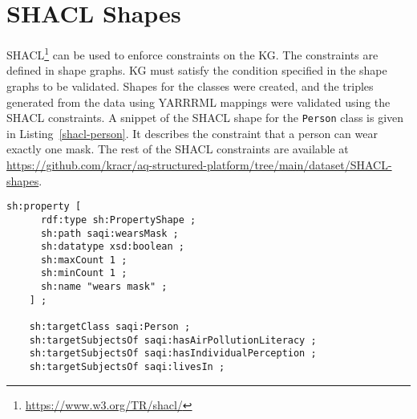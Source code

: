 \section{SHACL Shapes}
\label{sec:shacl}

SHACL\footnote{\url{https://www.w3.org/TR/shacl/}} can be used to enforce constraints on the KG. The constraints are defined in shape graphs. KG must satisfy the condition specified in the shape graphs to be validated. Shapes for the classes were created, and the triples generated from the data using YARRRML mappings were validated using the SHACL constraints. A snippet of the SHACL shape for the \texttt{Person} class is given in Listing~\ref{shacl-person}. It describes the constraint that a person can wear exactly one mask. The rest of the SHACL constraints are available at \url{https://github.com/kracr/aq-structured-platform/tree/main/dataset/SHACL-shapes}. %

\begin{lstlisting}[label=shacl-person,caption=SHACL constraints snippet for the Person class,float,frame=tb,captionpos=b]
    sh:property [
      rdf:type sh:PropertyShape ;
      sh:path saqi:wearsMask ;
      sh:datatype xsd:boolean ;
      sh:maxCount 1 ;
      sh:minCount 1 ;
      sh:name "wears mask" ;
    ] ;

    sh:targetClass saqi:Person ;
    sh:targetSubjectsOf saqi:hasAirPollutionLiteracy ;
    sh:targetSubjectsOf saqi:hasIndividualPerception ;
    sh:targetSubjectsOf saqi:livesIn ;
\end{lstlisting}

